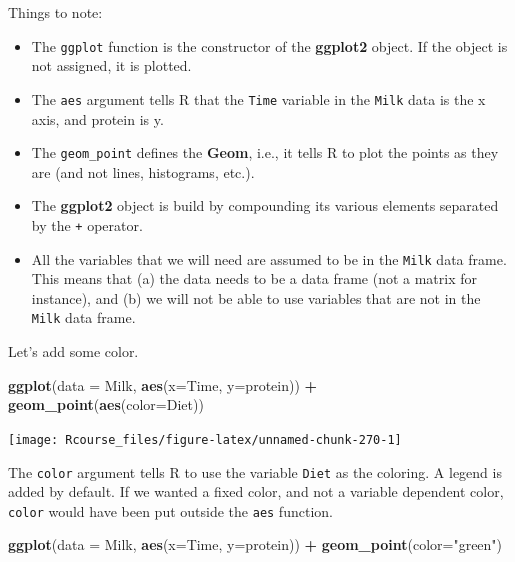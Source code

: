 \documentclass[]{book}
\newenvironment{Shaded}{\begin{snugshade}}{\end{snugshade}}
\newcommand{\DataTypeTok}[1]{\textcolor[rgb]{0.13,0.29,0.53}{#1}}
\newcommand{\KeywordTok}[1]{\textcolor[rgb]{0.13,0.29,0.53}{\textbf{#1}}}
\newcommand{\NormalTok}[1]{#1}
\newcommand{\OperatorTok}[1]{\textcolor[rgb]{0.81,0.36,0.00}{\textbf{#1}}}
\newcommand{\StringTok}[1]{\textcolor[rgb]{0.31,0.60,0.02}{#1}}
\providecommand{\tightlist}{%
  \setlength{\itemsep}{0pt}\setlength{\parskip}{0pt}}
\theoremstyle{definition}
\theoremstyle{definition}
\theoremstyle{definition}
\theoremstyle{remark}
\begin{document}
Things to note:

\begin{itemize}
\tightlist
\item
  The \texttt{ggplot} function is the constructor of the \textbf{ggplot2} object. If the object is not assigned, it is plotted.
\item
  The \texttt{aes} argument tells R that the \texttt{Time} variable in the \texttt{Milk} data is the x axis, and protein is y.
\item
  The \texttt{geom\_point} defines the \textbf{Geom}, i.e., it tells R to plot the points as they are (and not lines, histograms, etc.).
\item
  The \textbf{ggplot2} object is build by compounding its various elements separated by the \texttt{+} operator.
\item
  All the variables that we will need are assumed to be in the \texttt{Milk} data frame. This means that (a) the data needs to be a data frame (not a matrix for instance), and (b) we will not be able to use variables that are not in the \texttt{Milk} data frame.
\end{itemize}

Let's add some color.

\begin{Shaded}
\begin{Highlighting}[]
\KeywordTok{ggplot}\NormalTok{(}\DataTypeTok{data =}\NormalTok{ Milk, }\KeywordTok{aes}\NormalTok{(}\DataTypeTok{x=}\NormalTok{Time, }\DataTypeTok{y=}\NormalTok{protein)) }\OperatorTok{+}
\StringTok{  }\KeywordTok{geom_point}\NormalTok{(}\KeywordTok{aes}\NormalTok{(}\DataTypeTok{color=}\NormalTok{Diet))}
\end{Highlighting}
\end{Shaded}

\texttt{[image: Rcourse\_files/figure-latex/unnamed-chunk-270-1]}

The \texttt{color} argument tells R to use the variable \texttt{Diet} as the coloring.
A legend is added by default.
If we wanted a fixed color, and not a variable dependent color, \texttt{color} would have been put outside the \texttt{aes} function.

\begin{Shaded}
\begin{Highlighting}[]
\KeywordTok{ggplot}\NormalTok{(}\DataTypeTok{data =}\NormalTok{ Milk, }\KeywordTok{aes}\NormalTok{(}\DataTypeTok{x=}\NormalTok{Time, }\DataTypeTok{y=}\NormalTok{protein)) }\OperatorTok{+}
\StringTok{  }\KeywordTok{geom_point}\NormalTok{(}\DataTypeTok{color=}\StringTok{"green"}\NormalTok{)}
\end{Highlighting}
\end{Shaded}
\end{document}
